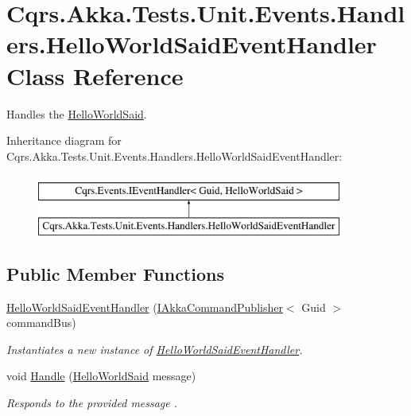 \hypertarget{classCqrs_1_1Akka_1_1Tests_1_1Unit_1_1Events_1_1Handlers_1_1HelloWorldSaidEventHandler}{}\section{Cqrs.\+Akka.\+Tests.\+Unit.\+Events.\+Handlers.\+Hello\+World\+Said\+Event\+Handler Class Reference}
\label{classCqrs_1_1Akka_1_1Tests_1_1Unit_1_1Events_1_1Handlers_1_1HelloWorldSaidEventHandler}


Handles the \hyperlink{classCqrs_1_1Akka_1_1Tests_1_1Unit_1_1Events_1_1HelloWorldSaid}{Hello\+World\+Said}.  


Inheritance diagram for Cqrs.\+Akka.\+Tests.\+Unit.\+Events.\+Handlers.\+Hello\+World\+Said\+Event\+Handler\+:\begin{figure}[H]
\begin{center}
\leavevmode
\includegraphics[height=2.000000cm]{classCqrs_1_1Akka_1_1Tests_1_1Unit_1_1Events_1_1Handlers_1_1HelloWorldSaidEventHandler}
\end{center}
\end{figure}
\subsection*{Public Member Functions}
\begin{DoxyCompactItemize}
\item 
\hyperlink{classCqrs_1_1Akka_1_1Tests_1_1Unit_1_1Events_1_1Handlers_1_1HelloWorldSaidEventHandler_a8bde891341691d7d73f4cb28f2568335_a8bde891341691d7d73f4cb28f2568335}{Hello\+World\+Said\+Event\+Handler} (\hyperlink{interfaceCqrs_1_1Akka_1_1Commands_1_1IAkkaCommandPublisher}{I\+Akka\+Command\+Publisher}$<$ Guid $>$ command\+Bus)
\begin{DoxyCompactList}\small\item\em Instantiates a new instance of \hyperlink{classCqrs_1_1Akka_1_1Tests_1_1Unit_1_1Events_1_1Handlers_1_1HelloWorldSaidEventHandler}{Hello\+World\+Said\+Event\+Handler}. \end{DoxyCompactList}\item 
void \hyperlink{classCqrs_1_1Akka_1_1Tests_1_1Unit_1_1Events_1_1Handlers_1_1HelloWorldSaidEventHandler_accb924e5856731b18120c21daed0f52a_accb924e5856731b18120c21daed0f52a}{Handle} (\hyperlink{classCqrs_1_1Akka_1_1Tests_1_1Unit_1_1Events_1_1HelloWorldSaid}{Hello\+World\+Said} message)
\begin{DoxyCompactList}\small\item\em Responds to the provided {\itshape message} . \end{DoxyCompactList}\end{DoxyCompactItemize}
